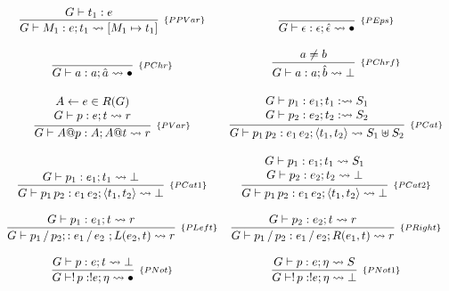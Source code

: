 \begin{figure}[H]
  \[
    \begin{array}{cc}
      \infer[_{\{PPVar\}}]{G\vdash M_1 : e ; t_1 \leadsto [M_1 \mapsto t_1]}{G \vdash t_1 : e} &
      \infer[_{\{PEps\}}]{G \vdash \epsilon : \epsilon ; \hat{\epsilon} \leadsto \bullet}{} \\ \\
      \infer[_{\{PChr\}}]{G\vdash a : a ; \hat{a} \leadsto \bullet}{} &
      \infer[_{\{PChrf\}}]{G \vdash a : a  ; \hat{b} \leadsto \bot}{a \neq b}\\ \\
        \infer[_{\{PVar\}}]{G\vdash A@p : A ; A@t \leadsto r}
                        {\begin{array}{c}
                           A \leftarrow e \in R(G) \\
                           G\vdash p : e ; t \leadsto r
                         \end{array}}
        &
        \infer[_{\{PCat\}}]{G\vdash p_1\,p_2 : e_1\,e_2; \langle t_1, t_2 \rangle \leadsto S_1 \uplus S_2}
                        {\begin{array}{c}
                           G\vdash p_1 :e_1 ; t_1 : \leadsto S_1 \\
                           G\vdash p_2 :e_2 ; t_2 :\leadsto S_2
                        \end{array}}\\ \\
      \infer[_{\{PCat1\}}]{G\vdash p_1\,p_2 : e_1 \, e_2  ; \langle t_1, t_2 \rangle \leadsto \bot}
                      {G\vdash p_1 : e_1 ; t_1 \leadsto \bot} &
      \infer[_{\{PCat2\}}]{G\vdash p_1\,p_2 :e_1\,e_2 ; \langle t_1, t_2 \rangle \leadsto \bot}
                        {\begin{array}{c}
                            G\vdash p_1 :e_1 ; t_1 \leadsto S_1 \\
                            G\vdash p_2 :e_2 ; t_2\leadsto \bot
                         \end{array}} \\ \\
      \infer[_{\{PLeft\}}]{G \vdash p_1\,/\,p_2 ;: e_1\,/\,e_2\ ;L(e_2, t) \leadsto r}
                       {G\vdash p_1 :e_1 ; t\leadsto r} &
      \infer[_{\{PRight\}}]{G \vdash p_1\,/\,p_2 : e_1\,/\,e_2; R(e_1, t) \leadsto r}
                       {G\vdash p_2 : e_2; t \leadsto r} \\ \\
      \infer[_{\{PNot\}}]{G \vdash !\,p : ! e ; \eta \leadsto \bullet}
                      {G \vdash p : e ; t \leadsto \bot} &
      \infer[_{\{PNot1\}}]{G \vdash !\,p : ! e ; \eta \leadsto \bot}
                       {G \vdash p : e ; \eta \leadsto S}\\ \\


\end{array}\]
\end{figure}
